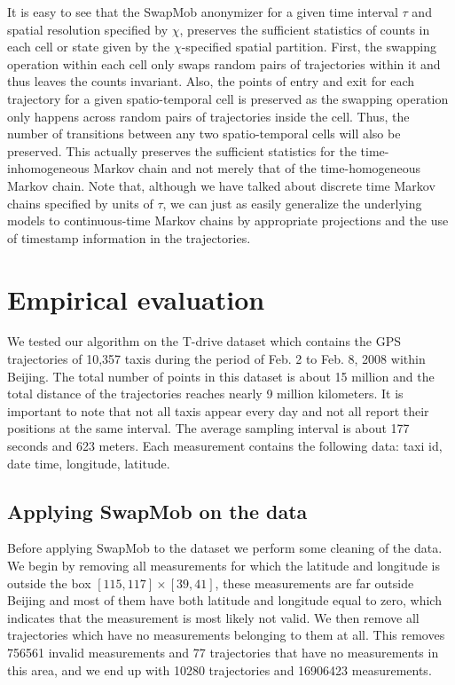\documentclass{llncs}
\begin{document}
It is easy to see that the SwapMob anonymizer for a given time interval $\tau$ and spatial resolution specified by $\chi$, preserves the sufficient statistics of counts in each cell or state given by the $\chi$-specified spatial partition.  
First, the swapping operation within each cell only swaps random pairs of trajectories within it and thus leaves the counts invariant.  
Also, the points of entry and exit for each trajectory for a given spatio-temporal cell is preserved as the swapping operation only happens across random pairs of trajectories inside the cell.  
Thus, the number of transitions between any two spatio-temporal cells will also be preserved.  
This actually preserves the sufficient statistics for the time-inhomogeneous Markov chain and not merely that of the time-homogeneous Markov chain. 
Note that, although we have talked about discrete time Markov chains specified by units of $\tau$, we can just as easily generalize the underlying models to continuous-time Markov chains by appropriate projections and the use of timestamp information in the trajectories.   

\section{Empirical evaluation}
We tested our algorithm on the T-drive dataset
\cite{Yuan2010,Yuan2011} which contains the GPS trajectories of
10,357 taxis during the period of Feb. 2 to Feb. 8, 2008 within
Beijing. The total number of points in this dataset is about 15
million and the total distance of the trajectories reaches nearly 9
million kilometers. It is important to note that not all taxis appear
every day and not all report their positions at the same interval. The
average sampling interval is about 177 seconds and 623 meters. Each
measurement contains the following data: taxi id, date time,
longitude, latitude.

\subsection{Applying SwapMob on the data}
Before applying SwapMob to the dataset we perform some cleaning of the
data. We begin by removing all measurements for which the latitude and
longitude is outside the box $[115, 117] \times [39, 41]$, these
measurements are far outside Beijing and most of them have both
latitude and longitude equal to zero, which indicates that the
measurement is most likely not valid. We then remove all trajectories
which have no measurements belonging to them at all. This
removes 756561 invalid measurements and 77 trajectories that have no
measurements in this area, and we end up with 10280 trajectories and 16906423
measurements.
\end{document}
